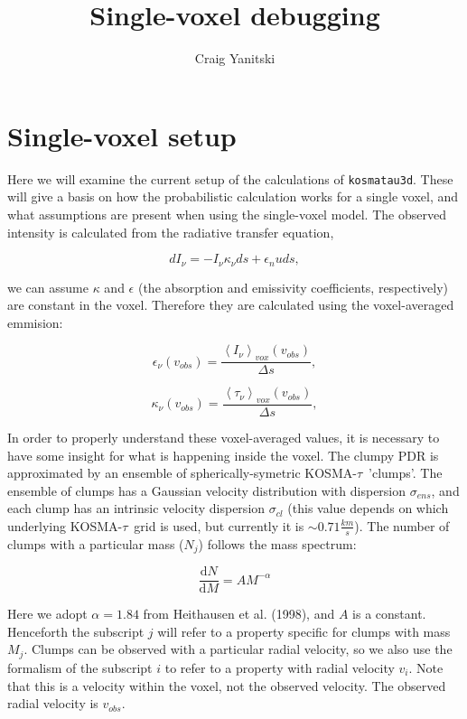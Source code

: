 \documentclass[a4paper]{article}
\newcommand{\kosmatau}{KOSMA-\(\tau\)}
\begin{document}
    \title{Single-voxel debugging}
    \author{Craig Yanitski}
    \maketitle

    \section{Single-voxel setup}
    \label{setup}

    Here we will examine the current setup of the calculations of \texttt{kosmatau3d}.
    These will give a basis on how the probabilistic calculation works for a single voxel, and what assumptions are present when using the single-voxel model.
    The observed intensity is calculated from the radiative transfer equation,

    \[
    dI_\nu = - I_\nu \kappa_\nu ds + \epsilon_nu ds,
    \]

    we can assume \(\kappa\) and \(\epsilon\) (the absorption and emissivity coefficients, respectively) are constant in the voxel.
    Therefore they are calculated using the voxel-averaged emmision:

    \[
    \epsilon_\nu (v_{obs}) = \frac{\left<I_\nu\right>_{vox} (v_{obs})}{\Delta s},
    \]

    \[
    \kappa_\nu (v_{obs}) = \frac{\left<\tau_\nu\right>_{vox} (v_{obs})}{\Delta s},
    \]

    In order to properly understand these voxel-averaged values, it is necessary to have some insight for what is happening inside the voxel.
    The clumpy PDR is approximated by an ensemble of spherically-symetric \kosmatau \ 'clumps'.
    The ensemble of clumps has a Gaussian velocity distribution with dispersion \(\sigma_{ens}\), and each clump has an intrinsic velocity dispersion \(\sigma_{cl}\) (this value depends on which underlying \kosmatau \ grid is used, but currently it is \(\sim0.71 \frac{km}{s}\)).
    The number of clumps with a particular mass (\(N_j\)) follows the mass spectrum:

    \[
    \frac{\mathrm{d}N}{\mathrm{d}M} = A M^{-\alpha}
    \]

    Here we adopt \(\alpha=1.84\) from Heithausen et al. (1998), and \(A\) is a constant.
    Henceforth the subscript \(j\) will refer to a property specific for clumps with mass \(M_j\).
    Clumps can be observed with a particular radial velocity, so we also use the formalism of the subscript \(i\) to refer to a property with radial velocity \(v_i\).
    Note that this is a velocity within the voxel, not the observed velocity.
    The observed radial velocity is \(v_{obs}\).
\end{document}
